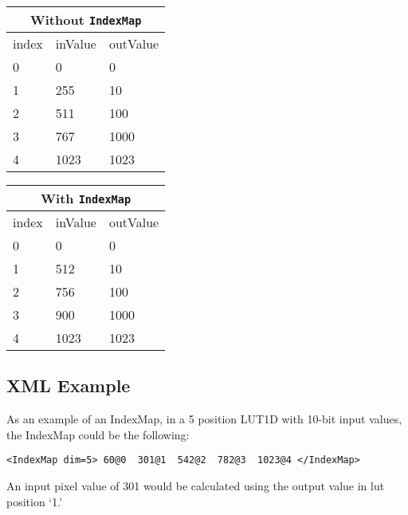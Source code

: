 \begin{center}
\begin{tabularx}{2in}{|X|X|X|}
\hline
\multicolumn{3}{|c|}{Without \texttt{IndexMap}} \\\hline
index & inValue & outValue \\\hline
0 & 0 & 0 \\\hline
1 & 255	& 10 \\\hline
2 & 511	& 100 \\\hline
3 & 767	& 1000 \\\hline
4 & 1023 &1023 \\\hline
\end{tabularx}
\quad
\begin{tabularx}{2in}{|X|X|X|}
\hline
\multicolumn{3}{|c|}{With \texttt{IndexMap}} \\\hline
index & inValue & outValue \\\hline
0 & 0 & 0 \\\hline
1 & 512 & 10 \\\hline
2 & 756 & 100 \\\hline
3 & 900 & 1000 \\\hline
4 & 1023 & 1023 \\\hline
\end{tabularx}
\end{center}


%
% 

\subsection*{XML Example}
As an example of an IndexMap, in a 5 position LUT1D with 10-bit input values, the IndexMap could be the following:

\lstinline!<IndexMap dim=5> 60@0  301@1  542@2  782@3  1023@4 </IndexMap>!

An input pixel value of 301 would be calculated using the output value in lut position `1.' 

